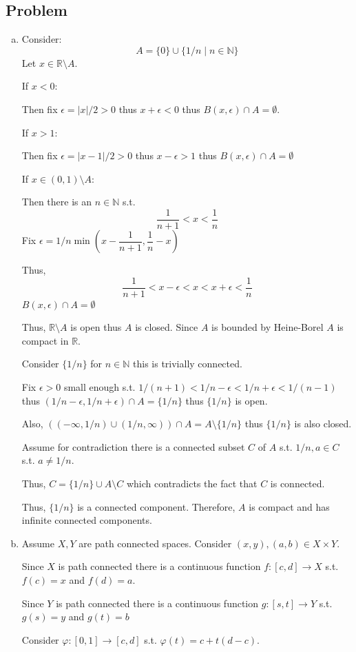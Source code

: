 \documentclass[12pt, letterpaper]{article}
\newcounter{problem}
\newcommand{\q}{
    \newpage %
    \stepcounter{problem} %
    \subsection*{Problem \arabic{problem}} %
}
\newcommand{\R}{\mathbb{R}}
\newcommand{\N}{\mathbb{N}}
\begin{document}
\q
\begin{enumerate}[(a)]
    \item Consider:
    \[A=\{0\} \cup \{1/n \mid n \in \N\}\]
    Let $x \in \R \setminus A$.

    If $x < 0$:

    Then fix $\epsilon=|x|/2 > 0$ thus $x+\epsilon < 0$ thus $B(x,\epsilon) \cap A = \emptyset$.

    If $x > 1$:

    Then fix $\epsilon=|x-1|/2 > 0$ thus $x-\epsilon > 1$ thus $B(x,\epsilon) \cap A = \emptyset$

    If $x \in (0,1) \setminus A$:

    Then there is an $n \in \N$ s.t.
    \[\dfrac{1}{n+1} < x < \dfrac{1}{n}\]
    Fix $\epsilon=1/n \min(x-\dfrac{1}{n+1}, \dfrac{1}{n}-x)$

    Thus,
    \[\dfrac{1}{n+1} < x-\epsilon < x < x+\epsilon < \dfrac{1}{n}\]
    $B(x,\epsilon) \cap A =\emptyset$

    Thus, $\R \setminus A$ is open thus $A$ is closed. Since $A$ is bounded by Heine-Borel $A$ is compact in $\R$.

    Consider $\{1/n\}$ for $n \in \N$ this is trivially connected.

    Fix $\epsilon>0$ small enough s.t. $1/(n+1) < 1/n - \epsilon < 1/n + \epsilon < 1/(n-1)$ thus $(1/n-\epsilon,1/n+\epsilon) \cap A = \{1/n\}$ thus $\{1/n\}$ is open.

    Also, $((-\infty, 1/n) \cup (1/n, \infty)) \cap A = A \setminus \{1/n\}$ thus $\{1/n\}$ is also closed.

    Assume for contradiction there is a connected subset $C$ of $A$ s.t. $1/n,a \in C$ s.t. $a \neq 1/n$.

    Thus, $C=\{1/n\} \cup A \setminus C$ which contradicts the fact that $C$ is connected.

    Thus, $\{1/n\}$ is a connected component. Therefore, $A$ is compact and has infinite connected components.

    \item Assume $X,Y$ are path connected spaces. Consider $(x,y),(a,b) \in X \times Y$.
    
    Since $X$ is path connected there is a continuous function $f:[c,d] \to X$ s.t. $f(c)=x$ and $f(d)=a$.

    Since $Y$ is path connected there is a continuous function $g:[s,t] \to Y$ s.t. $g(s)=y$ and $g(t)=b$

    Consider $\varphi:[0,1] \to [c,d]$ s.t. $\varphi(t)=c+t(d-c)$.


\end{enumerate}
\end{document}

